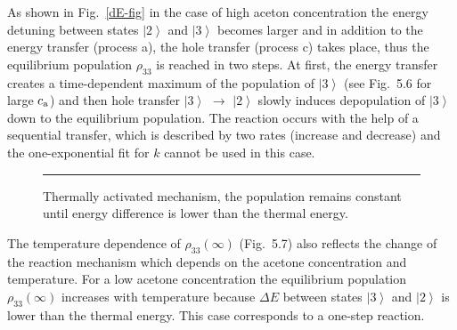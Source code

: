\documentclass[12pt,twoside,a4paper]{report}
\begin{document}
As shown in Fig.~\ref{dE-fig} in the 
case of high aceton concentration the energy detuning between states
$\left| 2 \right> $ and 
$\left| 3 \right> $ becomes larger and 
%
%
in addition to the energy transfer (process a), 
%
%
the hole transfer (process c) takes place, 
thus the {equilibrium }population {$\rho_{33}$} is 
reached in two steps. 
At first, the {energy transfer} creates a 
time-dependent maximum of the population of $\left| 3\right\rangle $ 
(see Fig.~5.6
for large $c_{\rm a}$) 
and then hole transfer 
$\left| 3\right\rangle $
$\rightarrow $
$\left| 2\right\rangle $ slowly induces depopulation of $%
\left| 3\right\rangle $ down to the equilibrium population. 
The reaction 
occurs with the help of a sequential transfer, which is described by two 
rates 
(increase and decrease) 
and the one-exponential fit for $k$
cannot be used in this case. 
 



\begin{footnotesize}\begin{figure}[!h] 
\begin{center} 
\parbox{5cm}{
\rule{-3cm}{0cm}\epsfxsize=9cm 
}
\end{center}
\caption[Thermally activated mechanism]
{\small 
\label{temperature-mechanism}
Thermally activated mechanism, the population remains constant until energy difference
is lower than the thermal energy.}
\end{figure}\end{footnotesize} 


The temperature dependence of 
$\rho_{33}(\infty)$ (Fig.~5.7)
also reflects the change of the reaction mechanism 
which depends on the  acetone concentration and temperature. 
%
For a low acetone concentration 
the equilibrium population  
$\rho_{33}(\infty)$
increases with temperature because 
$\Delta E$
 between states
 $\left| 3 \right> $ and 
$\left| 2 \right> $
is lower than
the thermal energy. 
%
This case corresponds to a one-step reaction. 
\end{document}
